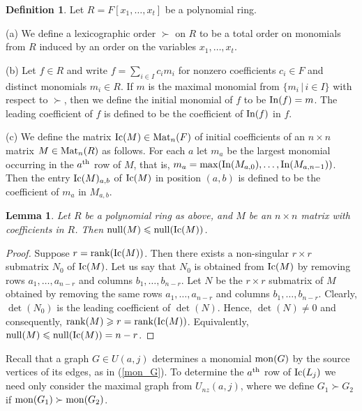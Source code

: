 \documentclass{amsproc}
\newtheorem{lemma}[theorem]{Lemma}
\theoremstyle{definition}
\newtheorem{definition}[theorem]{Definition}
\theoremstyle{remark}
\numberwithin{equation}{section}
\newcommand{\rank}{\operatorname{rank}}
\newcommand{\M}{{\rm Mat}}
\newcommand{\In}{{\rm In}}
\newcommand{\Ic}{{\rm Ic}}
\newcommand{\nullity}{{\rm null}}
\newcommand{\mon}{{\rm mon}}
\begin{document}
\begin{definition}\label{monom_order_def}
Let $R=F[x_1,\dots,x_t]$ be a polynomial ring.

(a) We define a lexicographic order $\succ$ on $R$ to be a total order on monomials from $R$ induced by an order on the variables $x_1,\dots,x_t$.

(b) Let $f\in R$ and write $f=\sum_{i\in I} c_i m_i$ for nonzero coefficients $c_i\in F$ and distinct monomials $m_i\in R$. If $m$ is the maximal monomial from 
$\{m_i \, | \,  i\in I\}$ with respect to $\succ$, then we define the initial monomial of $f$ to be $\In(f)=m$. 
The leading coefficient of $f$ is defined to be the coefficient of $\In(f)$ in $f$.

(c) We define the matrix $\Ic(M) \in \M_n(F)$ of initial coefficients of an $n \times n$ matrix $M \in \M_n(R)$ as follows. 
For each $a$ let $m_a$ be the largest monomial occurring in the $a^{\rm th}$ row of $M$, that is, 
$m_a=\max(\In(M_{a,0}),\dots,\In(M_{a,n-1}))$. Then the entry $\Ic(M)_{a, b}$ of $\Ic(M)$ 
in position $(a,b)$ is defined to be the coefficient of $m_a$ in $M_{a,b}$.
\end{definition}

\begin{lemma}\label{Ic_det} Let $R$ be a polynomial ring as above, 
and $M$ be an $n \times n$ matrix with coefficients in $R$. Then $\nullity(M) \leqslant \nullity(\Ic(M))$.
\end{lemma}

\begin{proof} Suppose $r = \rank(\Ic(M))$. Then there exists a non-singular $r \times r$ submatrix $N_0$ of $\Ic(M)$.
Let us say that $N_0$ is obtained from $\Ic(M)$ by removing rows $a_1, \ldots, a_{n-r}$ and columns $b_1, \dots, b_{n-r}$. 
Let $N$ be the $r \times r$ submatrix of $M$ obtained by removing the same rows $a_1, \ldots, a_{n-r}$ and 
columns $b_1, \dots, b_{n-r}$. Clearly, $\det(N_0)$ is the leading coefficient of $\det(N)$. Hence,
$\det(N) \neq 0$ and consequently, $\rank(M) \geqslant r = \rank(\Ic(M))$. Equivalently, $\nullity(M) \leqslant \nullity(\Ic(M)) = n- r$.
\end{proof}

Recall that a graph $G\in U(a,j)$ determines a monomial $\mon(G)$ by the source vertices of its edges, as in (\ref{mon_G}).
To determine the $a^{\rm th}$ row of $\Ic(L_j)$ we need only consider the maximal graph from $U_{nz}(a,j)$, where we define $G_1\succ G_2$ if $\mon(G_1)\succ \mon(G_2)$. 
\end{document}
